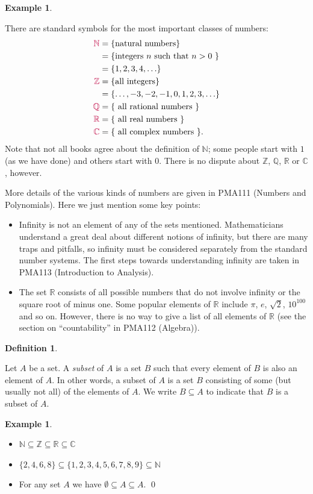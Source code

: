 \documentclass[a4paper]{book}
\newcommand{\PURPLE}[1]{{\color{purple}#1}}
\newcommand{\N}         {{\mathbb{N}}}
\newcommand{\Z}         {{\mathbb{Z}}}
\newcommand{\Q}         {{\mathbb{Q}}}
\newcommand{\R}         {{\mathbb{R}}}
\newcommand{\C}         {{\mathbb{C}}}
\newcommand{\sse}       {\subseteq}
\renewcommand{\:}{\colon}
\newcommand{\PMA}[1]{PMA#1}
\newcommand{\bilabel}[1]{\hypertarget{#1}{\label{#1}}}
\newcommand{\DEFN}[1]{\PURPLE{\emph{#1}}}
\theoremstyle{definition}
\newtheorem{definition}[theorem]{Definition}
\newtheorem{example}[theorem]{Example}
\begin{document}
\begin{example}\bilabel{eg-number-domains}
 There are standard symbols for the most important classes of
 numbers:
 \begin{align*}
  \PURPLE{\N} &= \{ \text{natural numbers} \} \\
            &= \{ \text{integers $n$ such that $n>0$ }\} \\
            &= \{ 1,2,3,4,\ldots \} \\
  \PURPLE{\Z} &= \{ \text{all integers} \} \\
            &= \{ \ldots,-3,-2,-1,0,1,2,3,\ldots \} \\
  \PURPLE{\Q} &= \{ \text{ all rational numbers } \} \\
  \PURPLE{\R} &= \{ \text{ all real numbers } \} \\
  \PURPLE{\C} &= \{ \text{ all complex numbers } \}.
 \end{align*}
 Note that not all books agree about the definition of $\N$; some
 people start with $1$ (as we have done) and others start with $0$.
 There is no dispute about $\Z$, $\Q$, $\R$ or $\C$, however.

 More details of the various kinds of numbers are given in \PMA{111}
 (Numbers and Polynomials).  Here we just mention some key points:
 \begin{itemize}
  \item Infinity is not an element of any of the sets mentioned.
   Mathematicians understand a great deal about different notions of
   infinity, but there are many traps and pitfalls, so infinity must
   be considered separately from the standard number systems.  The
   first steps towards understanding infinity are taken in \PMA{113}
   (Introduction to Analysis).
  \item The set $\R$ consists of all possible numbers that do not
   involve infinity or the square root of minus one.  Some popular
   elements of $\R$ include $\pi$, $e$, $\sqrt{2}$, $10^{100}$ and so
   on.  However, there is no way to give a list of all elements of
   $\R$ (see the section on ``countability'' in \PMA{112} (Algebra)).
 \end{itemize}
\end{example}

\begin{definition}\bilabel{defn-subset}
 Let $A$ be a set.  A \DEFN{subset} of $A$ is a set $B$ such that
 every element of $B$ is also an element of $A$.  In other words, a
 subset of $A$ is a set $B$ consisting of some (but usually not all)
 of the elements of $A$.  We write $B\sse A$ to indicate that $B$ is a
 subset of $A$.
\end{definition}
\begin{example}
 \begin{itemize}
  \item $\N\sse\Z\sse\R\sse\C$
  \item $\{2,4,6,8\}\sse\{1,2,3,4,5,6,7,8,9\}\sse\N$
  \item For any set $A$ we have $\emptyset\sse A\sse A$. \qed
 \end{itemize}
\end{example}
\end{document}
